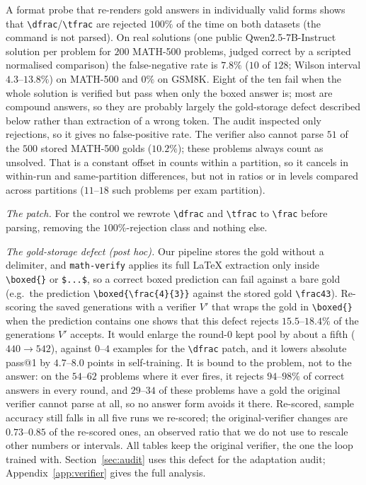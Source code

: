 \documentclass[runningheads]{llncs}
\begin{document}
A format probe that re-renders gold answers in individually valid forms shows
that \verb|\dfrac|/\verb|\tfrac| are rejected $100\%$ of the time on both
datasets (the command is not parsed). On real solutions (one public
Qwen2.5-7B-Instruct solution per problem for $200$ MATH-500 problems, judged
correct by a scripted normalised comparison) the false-negative rate is
$7.8\%$ ($10$ of $128$; Wilson interval $4.3$--$13.8\%$) on MATH-500 and $0\%$
on GSM8K. Eight of the ten fail when the whole solution is verified but pass
when only the boxed answer is; most are compound answers, so they are probably
largely the gold-storage defect described below rather than extraction of a
wrong token. The audit inspected only rejections, so it gives no
false-positive rate. The verifier also cannot parse $51$ of the $500$ stored
MATH-500 golds ($10.2\%$); these problems always count as unsolved. That is a
constant offset in counts within a partition, so it cancels in within-run and
same-partition differences, but not in ratios or in levels compared across
partitions ($11$--$18$ such problems per exam partition).

\emph{The patch.} For the control we rewrote \verb|\dfrac| and \verb|\tfrac| to
\verb|\frac| before parsing, removing the $100\%$-rejection class and nothing
else.

\emph{The gold-storage defect (post hoc).} Our pipeline stores the gold without
a delimiter, and \texttt{math-verify} applies its full \LaTeX{} extraction only
inside \verb|\boxed{}| or \verb|$...$|, so a correct boxed prediction can fail
against a bare gold (e.g.\ the prediction \verb|\boxed{\frac{4}{3}}| against
the stored gold \verb|\frac43|). Re-scoring the saved generations with a
verifier $V'$ that wraps the gold in \verb|\boxed{}| when the prediction
contains one shows that this defect rejects $15.5$--$18.4\%$ of the
generations $V'$ accepts. It would enlarge the round-0 kept pool by about a
fifth ($440\to542$), against $0$--$4$ examples for the \verb|\dfrac| patch, and
it lowers absolute pass@1 by $4.7$--$8.0$ points in self-training. It is bound
to the problem, not to the answer: on the $54$--$62$ problems where it ever
fires, it rejects $94$--$98\%$ of correct answers in every round, and $29$--$34$
of these problems have a gold the original verifier cannot parse at all, so no
answer form avoids it there. Re-scored, sample accuracy still falls in all five
runs we re-scored; the original-verifier changes are $0.73$--$0.85$ of the
re-scored ones, an observed ratio that we do not use to rescale other numbers
or intervals. All tables keep the original verifier, the one the loop trained
with. Section~\ref{sec:audit} uses this defect for the adaptation audit;
Appendix~\ref{app:verifier} gives the full analysis.
\end{document}
